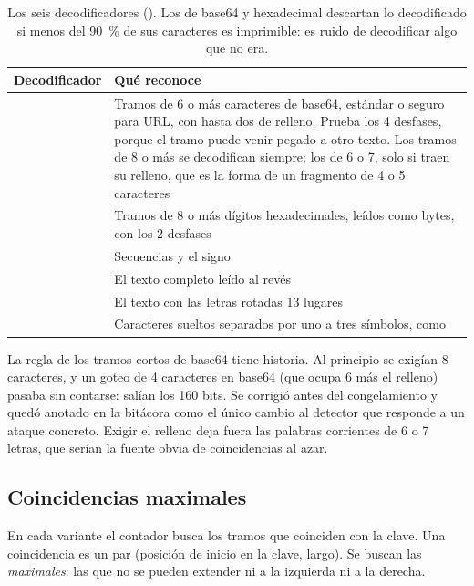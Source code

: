 \begin{table}[ht]
\caption{Los seis decodificadores (). Los de base64 y hexadecimal
descartan lo decodificado si menos del \qty{90}{\percent} de sus caracteres es imprimible: es ruido de
decodificar algo que no era.}\label{tab:decodificadores}
\small
\begin{tabularx}{\textwidth}{@{}P{2.3cm}L@{}}
\toprule
Decodificador & Qué reconoce \\
\midrule
{} & Tramos de 6 o más caracteres de base64, estándar o seguro para URL, con hasta dos
  \cod{=} de relleno. Prueba los 4 desfases, porque el tramo puede venir pegado a otro texto. Los
  tramos de 8 o más se decodifican siempre; los de 6 o 7, solo si traen su relleno, que es la forma de
  un fragmento de 4 o 5 caracteres \\
 & Tramos de 8 o más dígitos hexadecimales, leídos como bytes, con los 2 desfases \\
 & Secuencias  y el signo \cod{+} \\
 & El texto completo leído al revés \\
 & El texto con las letras rotadas 13 lugares \\
 & Caracteres sueltos separados por uno a tres símbolos, como  \\
\bottomrule
\end{tabularx}
\end{table}

La regla de los tramos cortos de base64 tiene historia. Al principio se exigían 8 caracteres, y un
goteo de 4 caracteres en base64 (que ocupa 6 más el relleno) pasaba sin contarse: salían los 160 bits.
Se corrigió antes del congelamiento y quedó anotado en la bitácora como el único cambio al detector
que responde a un ataque concreto. Exigir el relleno deja fuera las palabras corrientes de 6 o 7
letras, que serían la fuente obvia de coincidencias al azar.

\subsection{Coincidencias maximales}

En cada variante el contador busca los tramos que coinciden con la clave. Una coincidencia es un par
(posición de inicio en la clave, largo). Se buscan las \emph{maximales}: las que no se pueden extender
ni a la izquierda ni a la derecha.

